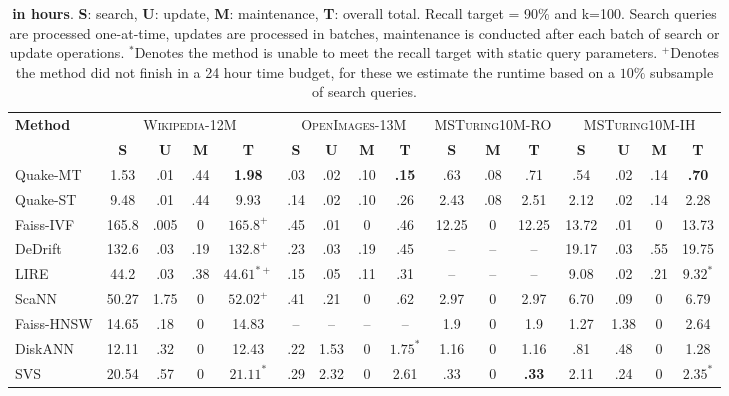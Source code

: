 \begin{table}[h]
\small
\centering
\begin{tabular}{|l|cccc|cccc|ccc|cccc|}
\hline
\multirow{2}{*}{\textbf{Method}} 
& \multicolumn{4}{c|}{\textsc{Wikipedia-12M}} 
& \multicolumn{4}{c|}{\textsc{OpenImages-13M}} 
& \multicolumn{3}{c|}{\textsc{MSTuring10M-RO}} 
& \multicolumn{4}{c|}{\textsc{MSTuring10M-IH}} \\ \cline{2-16}
& \textbf{S} & \textbf{U} & \textbf{M} & \textbf{T}
& \textbf{S} & \textbf{U} & \textbf{M} & \textbf{T}
& \textbf{S} & \textbf{M} & \textbf{T}
& \textbf{S} & \textbf{U} & \textbf{M} & \textbf{T} \\ \hline
Quake-MT   & 1.53 & .01 & .44 & \textbf{1.98}  &
            .03 & .02 & .10 & \textbf{.15}   &
            .63 & .08 & .71          &
            .54 & .02 & .14 & \textbf{.70} \\ 
Quake-ST   & 9.48 & .01 & .44 & 9.93  &
            .14 & .02 & .10 & .26               &
            2.43 & .08 & 2.51                   &
            2.12 & .02 & .14 & 2.28 \\ 
Faiss-IVF  & 165.8 & .005 & 0 & $165.8^{+}$ &
            .45 & .01 & 0 & .46     &
            12.25 & 0 & 12.25          &
            13.72 & .01 & 0 & 13.73 \\ 
DeDrift    & 132.6 & .03 & .19 & $132.8^{+}$ &
            .23 & .03 & .19 & .45     &
            – & – & –                     &
            19.17 & .03 & .55 & 19.75 \\ 
LIRE       & 44.2 & .03 & .38 & $44.61^{*+}$ &
            .15 & .05 & .11 & .31     &
            – & – & –                     &
            9.08 & .02 & .21 & $9.32^{*}$ \\ 
ScaNN      & 50.27 & 1.75 & 0 & $52.02^{+}$ &
            .41 & .21 & 0 & .62     &
            2.97 & 0 & 2.97             &
            6.70 & .09 & 0 & 6.79 \\ 
Faiss-HNSW & 14.65 & .18 & 0 & 14.83 &
            – & – & – & –                 &
            1.9 & 0 & 1.9             &
            1.27 & 1.38 & 0 & 2.64 \\ 
DiskANN    & 12.11 & .32 & 0 & 12.43 &
            .22 & 1.53 & 0 & $1.75^{*}$     &
            1.16 & 0 & 1.16             &
            .81 & .48 & 0 & 1.28 \\ 
SVS        & 20.54 & .57 & 0 & $21.11^{*}$ &
            .29 & 2.32 & 0 & 2.61     &
            .33 & 0 & \textbf{.33}             &
            2.11 & .24 & 0 & $2.35^{*}$ \\ \hline
\end{tabular}
\caption{ \textbf{in hours}.  \textbf{S}: search, \textbf{U}: update, \textbf{M}: maintenance, \textbf{T}: overall total. Recall target = 90\% and k=100. Search queries are processed one-at-time, updates are processed in batches, maintenance is conducted after each batch of search or update operations. $^{*}$Denotes the method is unable to meet the recall target with static query parameters. $^{+}$Denotes the method did not finish in a 24 hour time budget, for these we estimate the runtime based on a $10\%$ subsample of search queries.}
\label{tab:workload_comparison}
\end{table}

